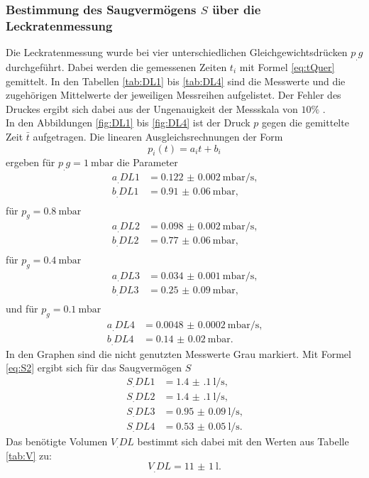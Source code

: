 \subsubsection{Bestimmung des Saugvermögens $S$ über die Leckratenmessung}

Die Leckratenmessung wurde bei vier unterschiedlichen Gleichgewichtsdrücken $p_.g$ durchgeführt. Dabei werden die gemessenen Zeiten $t_i$ mit Formel \eqref{eq:tQuer} gemittelt.
In den Tabellen \ref{tab:DL1} bis \ref{tab:DL4} sind die Messwerte und die zugehörigen Mittelwerte der jeweiligen Messreihen aufgelistet. Der Fehler des Druckes ergibt sich dabei aus der Ungenauigkeit der Messskala von $10\%$ \cite{V70}.\\
In den Abbildungen \ref{fig:DL1} bis \ref{fig:DL4} ist der Druck $p$ gegen die gemittelte Zeit $\bar{t}$ aufgetragen.
Die linearen Ausgleichsrechnungen der Form
\[
p_i(t) = a_it+b_i
\]
ergeben für $p_.g = \SI{1}{\milli\bar}$ die Parameter
\begin{align*}
a_.{DL1} &= \SI{0.122(2)}{\milli\bar\per\second} \text{,}\\
b_.{DL1} &= \SI{0.91(6)}{\milli\bar} \text{,}\\
\end{align*}
für $p_g = \SI{0.8}{\milli\bar}$
\begin{align*}
a_.{DL2} &= \SI{0.098(2)}{\milli\bar\per\second} \text{,}\\
b_.{DL2} &= \SI{0.77(6)}{\milli\bar} \text{,}\\
\end{align*}
für $p_g = \SI{0.4}{\milli\bar}$
\begin{align*}
a_.{DL3} &= \SI{0.034(1)}{\milli\bar\per\second} \text{,}\\
b_.{DL3} &= \SI{0.25(9)}{\milli\bar} \text{,}\\
\end{align*}
und für $p_g = \SI{0.1}{\milli\bar}$
\begin{align*}
a_.{DL4} &= \SI{0.0048(2)}{\milli\bar\per\second} \text{,}\\
b_.{DL4} &= \SI{0.14(2)}{\milli\bar} \text{.}
\end{align*}
In den Graphen sind die nicht genutzten Messwerte Grau markiert.
Mit Formel \eqref{eq:S2} ergibt sich für das Saugvermögen $S$
\begin{align*}
S_.{DL1} &= \SI{1.4(1)}{\litre\per\second} \text{,}\\
S_.{DL2} &= \SI{1.4(1)}{\litre\per\second} \text{,}\\
S_.{DL3} &= \SI{0.95(9)}{\litre\per\second} \text{,}\\
S_.{DL4}   &= \SI{0.53(5)}{\litre\per\second} \text{.}
\end{align*}
Das benötigte Volumen $V_.{DL}$ bestimmt sich dabei mit den Werten aus Tabelle \ref{tab:V} zu:
\[
V_.{DL} = \SI{11(1)}{\litre}\text{.}
\]

